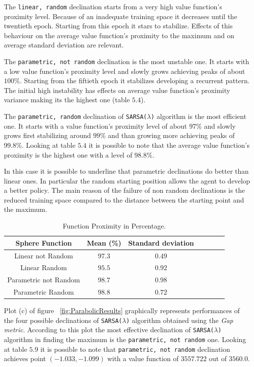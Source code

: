 The {\tt linear, random} declination starts from a very high value function's proximity level. Because of an inadequate training space it decreases until the twentieth epoch. Starting from this epoch it stars to stabilize. Effects of this behaviour on the average value function's proximity to the maximum and on average standard deviation are relevant.
 
The {\tt parametric, not random} declination is the most unstable one. It starts with a low value function's proximity level and slowly grows achieving peaks of about $100\%$. Starting from the fiftieth epoch it stabilizes developing a recurrent pattern. The initial high instability has effects on average value function's proximity variance making its the highest one (table $5.4$).
 
The {\tt parametric, random} declination of {\tt SARSA($\lambda$)} algorithm is the most efficient one. It starts with a value function's proximity level of about $97\%$ and slowly grows first stabilizing around $99\%$ and than growing more achieving peaks of $99.8\%$. Looking at table $5.4$ it is possible to note that the average value function's proximity is the highest one with a level of $98.8\%$.
 
In this case it is possible to underline that parametric declinations do better than linear ones. In particular the random starting position allows the agent to develop a better policy. The main reason of the failure of non random declinations is the reduced training space compared to the distance between the starting point and the maximum.

\begin{table}[h!]
	\centering
	\resizebox{\linewidth}{!} {
	\begin{tabular}{c| cccccc} 
		\hline \textbf{Sphere Function}
		& \textbf{Mean (\%)} & \textbf{Standard deviation} \\ 
		\hline Linear not Random
		& $97.3$ & \cellcolor{green!25}$0.49$ \\ 
		\hline Linear Random
		& $95.5$ & $0.92$ \\ 
		\hline Parametric not Random
		& $98.7$ & $0.98$ \\ 
		\hline Parametric Random
		& \cellcolor{green!25}$98.8$ & $0.72$ \\ 
		\hline 
	\end{tabular} 
}
\label{ParabolicTabProximity}
\caption{Function Proximity in Percentage.} 
\end{table}

Plot (c) of figure ~\ref{fig:ParabolicResults} graphically represents performances of the four possible declinations of {\tt SARSA($\lambda$)} algorithm obtained using the \textit{Gap metric}. According to this plot the most effective declination of {\tt SARSA($\lambda$)} algorithm in finding the maximum is the {\tt parametric, not random} one. Looking at table $5.9$ it is possible to note that {\tt parametric, not random} declination achieves point $(-1.033, -1.099)$ with a value function of $3557.722$ out of $3560.0$.

